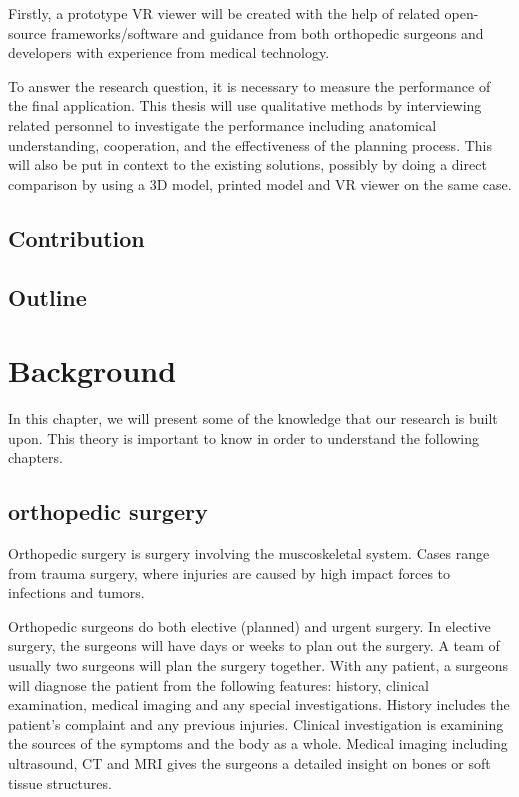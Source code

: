 \documentclass[a4paper]{report}
\begin{document}
Firstly, a prototype VR viewer will be created with the help of related
open-source frameworks/software and guidance from both orthopedic surgeons and
developers with experience from medical technology.

To answer the research question, it is necessary to measure the
performance of the final application. This thesis will use qualitative methods
by interviewing related personnel to investigate the performance including
anatomical understanding, cooperation, and the effectiveness of the planning
process.
This will also be put in context to the existing solutions, possibly
by doing a direct comparison by using a 3D model, printed model and VR viewer
on the same case.
\section{Contribution}
\section{Outline}

\chapter{Background}\label{Background}
In this chapter, we will present some of the knowledge that our research is built upon. This theory is important to know in order to understand the following chapters.

\section{orthopedic surgery}

Orthopedic surgery is surgery involving the muscoskeletal system. Cases range from trauma surgery, where injuries are caused by high impact forces to infections and tumors\cite{manual ortho}.

Orthopedic surgeons do both elective (planned) and urgent surgery. In elective surgery, the surgeons will have days or weeks to plan out the surgery. A team of usually two surgeons will plan the surgery together.
With any patient, a surgeons will diagnose the patient from the following features: history, clinical examination, medical imaging and any special investigations. History includes the patient's complaint and any previous injuries. Clinical investigation is  examining the sources of the symptoms and the body as a whole. Medical imaging including ultrasound, CT and MRI gives the surgeons a detailed insight on bones or soft tissue structures.
\end{document}
